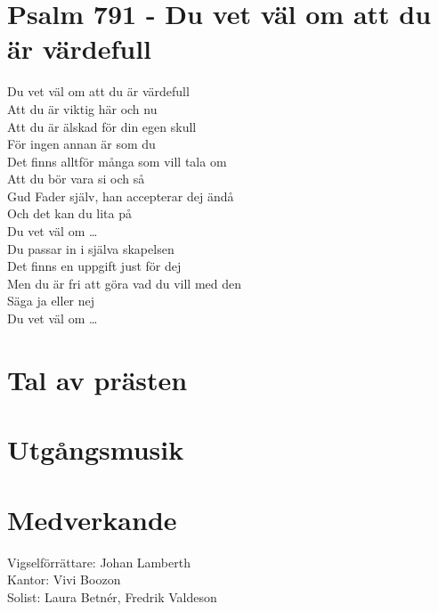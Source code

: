 \documentclass[a5paper, 12pt]{article}
\begin{document}
\begin{center}
		\section{Psalm 791 - Du vet väl om att du är värdefull}
		Du vet väl om att du är värdefull   \\
		Att du är viktig här och nu         \\
		Att du är älskad för din egen skull \\
		För ingen annan är som du           \\
		\vspace{0.2cm}
		Det finns alltför många som vill tala om \\
		Att du bör vara si och så                \\ 
		Gud Fader själv, han accepterar dej ändå \\
		Och det kan du lita på                   \\
		\vspace{0.2cm} 
		Du vet väl om …                          \\
		\vspace{0.2cm}
		Du passar in i själva skapelsen            \\  
		Det finns en uppgift just för dej          \\ 
		Men du är fri att göra vad du vill med den \\ 
		Säga ja eller nej                          \\
		\vspace{0.2cm}   
		Du vet väl om …                            \\
	\vspace{0.4cm}

	\section{Tal av prästen}
	\vspace{\fill} 
	
	\section{Utgångsmusik}
\vspace{\fill} 

	\section{\hfil Medverkande \hfil}
	Vigselförrättare: Johan Lamberth \\
	Kantor: Vivi Boozon \\
	Solist: Laura Betnér, Fredrik Valdeson \\
	
	\end{center}
\end{document}
